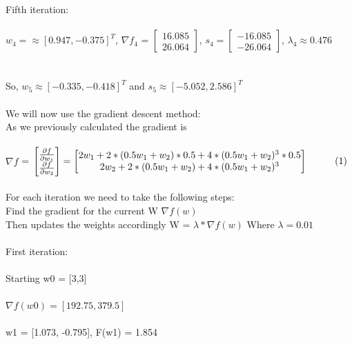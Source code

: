 \documentclass{article}
\begin{document}
\noindent Fifth iteration:\\\\ $w_4 = \approx [0.947, -0.375]^T$, \( \nabla f_4 \) = $ \begin{bmatrix} 
  16.085\\
  26.064 
\end{bmatrix}$, $ s_4 = \begin{bmatrix} 
  -16.085\\
  -26.064
\end{bmatrix}$, $\lambda_4 \approx 0.476$\\ \\ \\ So, $w_5 \approx [-0.335, -0.418]^T$ and $s_5 \approx [-5.052, 2.586]^T$ \\ \\


\noindent We will now use the gradient descent method: \\
As we previously calculated the gradient is\\ \\
\( \nabla f \) = $ \begin{bmatrix}
  \frac{\partial f}{\partial w_1} \\
  \frac{\partial f}{\partial w_2} 
\end{bmatrix} = \begin{bmatrix}
  2w_1 + 2*(0.5w_1+w_2)*0.5 +4*(0.5w_1+w_2)^3 * 0.5 \\
  2w_2 +2*(0.5w_1+w_2) +4*(0.5w_1+w_2)^3 
\end{bmatrix} \hspace*{1cm}(1)$ \\ \\

\noindent For each iteration we need to take the following steps: \\
Find the gradient for the current W $\nabla f(w)$ \\
Then updates the weights accordingly W = $\lambda * \nabla f(w)$
Where $\lambda= 0.01$ \\ \\

\noindent First iteration: \\ \\
Starting w0 = [3,3] \\ \\
$\nabla f(w0)= [192.75 , 379.5]$ \\ \\
w1 = [1.073, -0.795], F(w1) = 1.854 \\ \\
\end{document}
